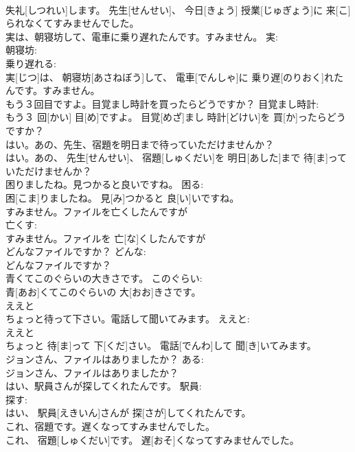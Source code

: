 \documentclass[8pt]{extreport}
\begin{document}
\begin{CJK}{UTF8}{min}
\\	失礼[しつれい]します。 先生[せんせい]、 今日[きょう] 授業[じゅぎょう]に 来[こ]られなくてすみませんでした。	
\\	実は、朝寝坊して、電車に乗り遅れたんです。すみません。	実: 
\\	朝寝坊: 
\\	乗り遅れる: 
\\	実[じつ]は、 朝寝坊[あさねぼう]して、 電車[でんしゃ]に 乗り遅[のりおく]れたんです。すみません。	
\\	もう３回目ですよ。目覚まし時計を買ったらどうですか？	目覚まし時計: 
\\	もう３ 回[かい] 目[め]ですよ。 目覚[めざ]まし 時計[どけい]を 買[か]ったらどうですか？	
\\	はい。あの、先生、宿題を明日まで待っていただけませんか？	
\\	はい。あの、 先生[せんせい]、 宿題[しゅくだい]を 明日[あした]まで 待[ま]っていただけませんか？	
\\	困りましたね。見つかると良いですね。	困る: 
\\	困[こま]りましたね。 見[み]つかると 良[い]いですね。	
\\	すみません。ファイルを亡くしたんですが
\\	亡くす: 
\\	すみません。ファイルを 亡[な]くしたんですが
\\	どんなファイルですか？	どんな: 
\\	どんなファイルですか？	
\\	青くてこのぐらいの大きさです。	このぐらい: 
\\	青[あお]くてこのぐらいの 大[おお]きさです。	
\\	ええと
\\	ちょっと待って下さい。電話して聞いてみます。	ええと: 
\\	ええと
\\	ちょっと 待[ま]って 下[くだ]さい。 電話[でんわ]して 聞[き]いてみます。	
\\	ジョンさん、ファイルはありましたか？	ある: 
\\	ジョンさん、ファイルはありましたか？	
\\	はい、駅員さんが探してくれたんです。	駅員: 
\\	探す: 
\\	はい、 駅員[えきいん]さんが 探[さが]してくれたんです。	
\\	これ、宿題です。遅くなってすみませんでした。	
\\	これ、 宿題[しゅくだい]です。 遅[おそ]くなってすみませんでした。	

\end{CJK}
\end{document}

